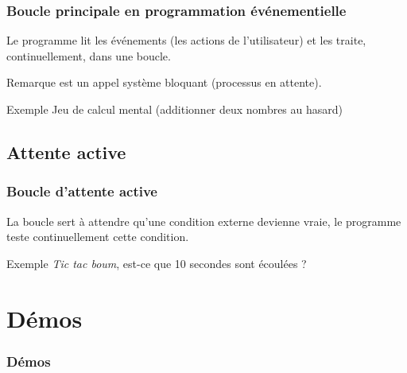 \documentclass[xcolor=pdftex,svgnames,table]{beamer}
\begin{document}
\begin{frame}[fragile]
\frametitle{Boucle principale en programmation événementielle}

Le programme lit les événements
(les actions de l'utilisateur) et les traite, continuellement, dans
une boucle.

\begin{block}{Remarque}
  est un \alert{appel système bloquant} (processus en attente).
\end{block}
\begin{block}{Exemple}
Jeu de calcul mental (additionner deux nombres au hasard)\nowrite
\end{block}



\end{frame}

\subsection{Attente active}
\begin{frame}[fragile]
  \frametitle{Boucle d'attente active}
La boucle sert à attendre qu'une condition externe devienne vraie, le
programme teste continuellement cette condition. 
\pause
\begin{block}{Exemple}
  \emph{Tic tac boum}, est-ce que 10 secondes sont écoulées ?\nowrite
\end{block}


\end{frame}

\section{Démos}
\begin{frame}
  \frametitle{Démos}
\end{frame}
\end{document}
